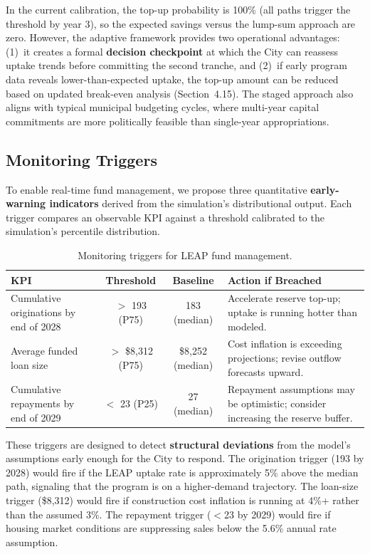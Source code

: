 \documentclass[11pt, letterpaper]{article}
\begin{document}
In the current calibration, the top-up probability is 100\% (all paths trigger the threshold by year 3), so the expected savings versus the lump-sum approach are zero. However, the adaptive framework provides two operational advantages: (1)~it creates a formal \textbf{decision checkpoint} at which the City can reassess uptake trends before committing the second tranche, and (2)~if early program data reveals lower-than-expected uptake, the top-up amount can be reduced based on updated break-even analysis (Section~4.15). The staged approach also aligns with typical municipal budgeting cycles, where multi-year capital commitments are more politically feasible than single-year appropriations.

\subsection{Monitoring Triggers}

To enable real-time fund management, we propose three quantitative \textbf{early-warning indicators} derived from the simulation's distributional output. Each trigger compares an observable KPI against a threshold calibrated to the simulation's percentile distribution.

\begin{table}[H]
  \centering
  \caption{Monitoring triggers for LEAP fund management.}
  \label{tab:monitoring}
  \begin{tabular}{@{}p{3.5cm}ccp{5cm}@{}}
    \toprule
    \textbf{KPI} & \textbf{Threshold} & \textbf{Baseline} & \textbf{Action if Breached} \\
    \midrule
    Cumulative originations by end of 2028 & $>$ 193 (P75) & 183 (median) & Accelerate reserve top-up; uptake is running hotter than modeled. \\
    Average funded loan size & $>$ \$8{,}312 (P75) & \$8{,}252 (median) & Cost inflation is exceeding projections; revise outflow forecasts upward. \\
    Cumulative repayments by end of 2029 & $<$ 23 (P25) & 27 (median) & Repayment assumptions may be optimistic; consider increasing the reserve buffer. \\
    \bottomrule
  \end{tabular}
\end{table}

These triggers are designed to detect \textbf{structural deviations} from the model's assumptions early enough for the City to respond. The origination trigger (193 by 2028) would fire if the LEAP uptake rate is approximately 5\% above the median path, signaling that the program is on a higher-demand trajectory. The loan-size trigger (\$8{,}312) would fire if construction cost inflation is running at 4\%+ rather than the assumed 3\%. The repayment trigger ($<$23 by 2029) would fire if housing market conditions are suppressing sales below the 5.6\% annual rate assumption.
\end{document}
